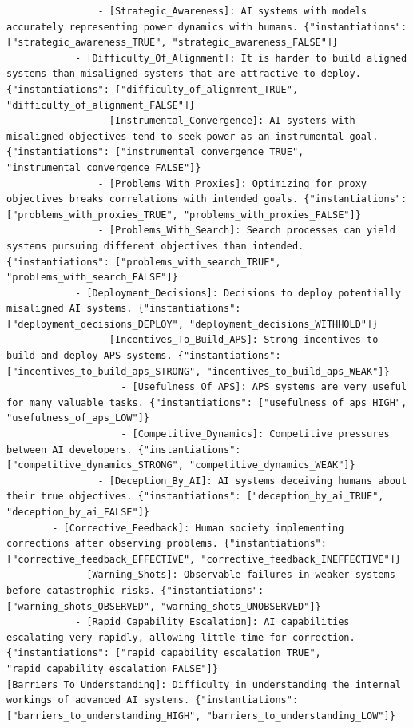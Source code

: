 \documentclass[
  11pt,
  letterpaper,
]{book}
\begin{document}
\begin{verbatim}
                - [Strategic_Awareness]: AI systems with models accurately representing power dynamics with humans. {"instantiations": ["strategic_awareness_TRUE", "strategic_awareness_FALSE"]}
            - [Difficulty_Of_Alignment]: It is harder to build aligned systems than misaligned systems that are attractive to deploy. {"instantiations": ["difficulty_of_alignment_TRUE", "difficulty_of_alignment_FALSE"]}
                - [Instrumental_Convergence]: AI systems with misaligned objectives tend to seek power as an instrumental goal. {"instantiations": ["instrumental_convergence_TRUE", "instrumental_convergence_FALSE"]}
                - [Problems_With_Proxies]: Optimizing for proxy objectives breaks correlations with intended goals. {"instantiations": ["problems_with_proxies_TRUE", "problems_with_proxies_FALSE"]}
                - [Problems_With_Search]: Search processes can yield systems pursuing different objectives than intended. {"instantiations": ["problems_with_search_TRUE", "problems_with_search_FALSE"]}
            - [Deployment_Decisions]: Decisions to deploy potentially misaligned AI systems. {"instantiations": ["deployment_decisions_DEPLOY", "deployment_decisions_WITHHOLD"]}
                - [Incentives_To_Build_APS]: Strong incentives to build and deploy APS systems. {"instantiations": ["incentives_to_build_aps_STRONG", "incentives_to_build_aps_WEAK"]}
                    - [Usefulness_Of_APS]: APS systems are very useful for many valuable tasks. {"instantiations": ["usefulness_of_aps_HIGH", "usefulness_of_aps_LOW"]}
                    - [Competitive_Dynamics]: Competitive pressures between AI developers. {"instantiations": ["competitive_dynamics_STRONG", "competitive_dynamics_WEAK"]}
                - [Deception_By_AI]: AI systems deceiving humans about their true objectives. {"instantiations": ["deception_by_ai_TRUE", "deception_by_ai_FALSE"]}
        - [Corrective_Feedback]: Human society implementing corrections after observing problems. {"instantiations": ["corrective_feedback_EFFECTIVE", "corrective_feedback_INEFFECTIVE"]}
            - [Warning_Shots]: Observable failures in weaker systems before catastrophic risks. {"instantiations": ["warning_shots_OBSERVED", "warning_shots_UNOBSERVED"]}
            - [Rapid_Capability_Escalation]: AI capabilities escalating very rapidly, allowing little time for correction. {"instantiations": ["rapid_capability_escalation_TRUE", "rapid_capability_escalation_FALSE"]}
[Barriers_To_Understanding]: Difficulty in understanding the internal workings of advanced AI systems. {"instantiations": ["barriers_to_understanding_HIGH", "barriers_to_understanding_LOW"]}

\end{verbatim}
\end{document}

